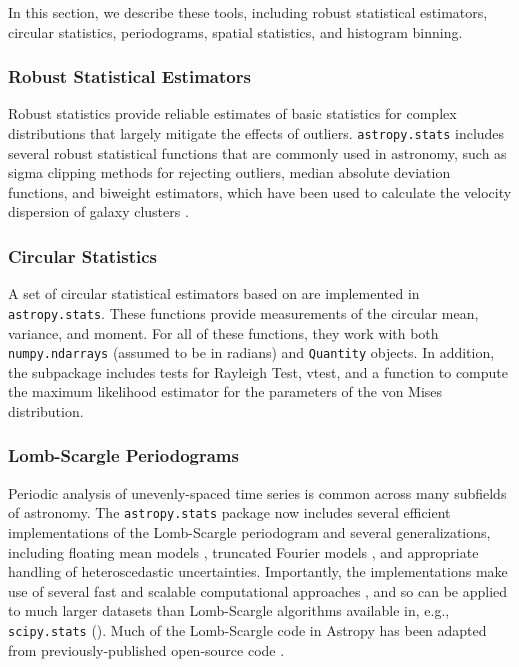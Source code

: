 \documentclass[modern]{aastex61}
\newcommand{\package}[1]{\texttt{#1}\xspace}
\newcommand{\astropy}{Astropy\xspace}
\begin{document}
In this section, we describe these tools, including robust statistical estimators, circular statistics, periodograms, spatial statistics, and histogram binning.



\subsubsection{Robust Statistical Estimators}

Robust statistics provide reliable estimates of basic statistics for complex distributions that largely mitigate the effects of outliers. \package{astropy.stats} includes several robust statistical functions that are commonly used in astronomy, such as sigma clipping methods for rejecting outliers, median absolute deviation functions, and biweight estimators, which have been used to calculate the velocity dispersion of galaxy clusters \citep{Beers1990}.

\subsubsection{Circular Statistics}

A set of circular statistical estimators based on \citet{JammalamadakaSengupta}
are implemented in \package{astropy.stats}.  These functions provide
measurements of the circular mean, variance, and moment.   For all of these
functions, they work with both \texttt{numpy.ndarrays} (assumed to be in
radians) and \texttt{Quantity} objects.  In addition, the subpackage includes
tests for Rayleigh Test, vtest, and a function to compute the maximum likelihood
estimator for the parameters of the von Mises distribution.

\subsubsection{Lomb-Scargle Periodograms}

Periodic analysis of unevenly-spaced time series is common across many subfields of astronomy. The \package{astropy.stats} package now includes several efficient implementations of the Lomb-Scargle periodogram \citep{Lomb76, Scargle82} and several generalizations, including floating mean models \citep{Zechmeister09}, truncated Fourier models \citep{Bretthorst2003}, and appropriate handling of heteroscedastic uncertainties. Importantly, the implementations make use of several fast and scalable computational approaches \citep[e.g.,][]{Press89, Palmer09}, and so can be applied to much larger datasets than Lomb-Scargle algorithms available in, e.g., \package{scipy.stats} (\citealt{scipy}). Much of the Lomb-Scargle code in \astropy has been adapted from previously-published open-source code \citep{astroML, VanderPlas2015}.
\end{document}
